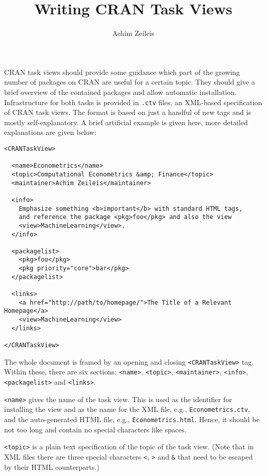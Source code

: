 \documentclass[a4paper]{article}
\begin{document}

\title{Writing CRAN Task Views}
\author{Achim Zeileis}
\date{}
\maketitle

CRAN task views should provide some guidance which part
of the growing number of packages on CRAN are useful for
a certain topic. They should give a brief overview of the
contained packages and allow automatic installation. Infrastructure
for both tasks is provided in \verb/.ctv/ files, an XML-based
specification of CRAN task views. The format is based on just
a handful of new tags and is mostly self-explanatory. A brief
artificial example is given here, more detailed explanations
are given below:

\begin{verbatim}
<CRANTaskView>

  <name>Econometrics</name>
  <topic>Computational Econometrics &amp; Finance</topic>
  <maintainer>Achim Zeileis</maintainer>
  
  <info>
    Emphasize something <b>important</b> with standard HTML tags,
    and reference the package <pkg>foo</pkg> and also the view
    <view>MachineLearning</view>.
  </info>

  <packagelist>
    <pkg>foo</pkg>
    <pkg priority="core">bar</pkg>
  </packagelist>

  <links>
    <a href="http://path/to/homepage/">The Title of a Relevant Homepage</a>
    <view>MachineLearning</view>
  </links>
  
</CRANTaskView>
\end{verbatim}

The whole document is framed by an opening and closing \verb/<CRANTaskView>/
tag. Within these, there are six sections: \verb/<name>/, \verb/<topic>/,
\verb/<maintainer>/, \verb/<info>/, \verb/<packagelist>/ and \verb/<links>/.

\verb/<name>/ gives the name of the task view. This is used as the identifier
for installing the view and as the name for the XML file, e.g., \verb/Econometrics.ctv/,
and the auto-generated HTML file, e.g., \verb/Econometrics.html/. Hence, it should be
not too long and contain no special characters like spaces.

\verb/<topic>/ is a plain text specification of the topic of the task view.
(Note that in XML files there are three special characters \verb/</, \verb/>/
and \verb/&/ that need to be escaped by their HTML counterparts.)
\end{document}
